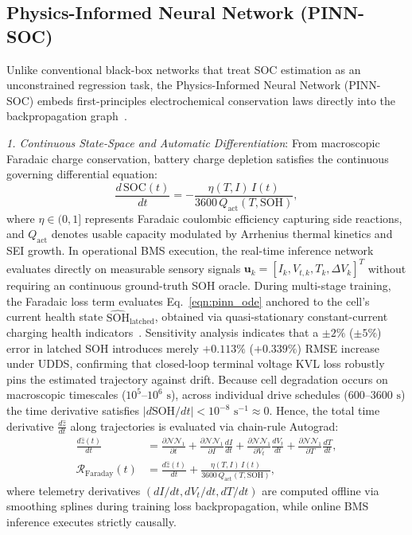 \documentclass[balance,nocopyright,upint,varvw,hyphenate,barcolor=NavyBlue,nolists]{asmejour}
\begin{document}
\subsection{Physics-Informed Neural Network (PINN-SOC)}
Unlike conventional black-box networks that treat SOC estimation as an unconstrained regression task, the Physics-Informed Neural Network (PINN-SOC) embeds first-principles electrochemical conservation laws directly into the backpropagation graph~\cite{Raissi2019pinn,Brancato2026,Li2023nature}.

\emph{1. Continuous State-Space and Automatic Differentiation}: From macroscopic Faradaic charge conservation, battery charge depletion satisfies the continuous governing differential equation:
\begin{equation}\label{eqn:pinn_ode}
\frac{d\,\text{SOC}(t)}{dt} = -\frac{\eta(T, I)\, I(t)}{3600\,Q_{\text{act}}(T, \text{SOH})},
\end{equation}
where $\eta \in (0, 1]$ represents Faradaic coulombic efficiency capturing side reactions, and $Q_{\text{act}}$ denotes usable capacity modulated by Arrhenius thermal kinetics and SEI growth. In operational BMS execution, the real-time inference network evaluates directly on measurable sensory signals $\mathbf{u}_k = [I_k, V_{t,k}, T_k, \Delta V_k]^T$ without requiring an continuous ground-truth SOH oracle. During multi-stage training, the Faradaic loss term evaluates Eq.~\eqref{eqn:pinn_ode} anchored to the cell's current health state $\hat{\text{SOH}}_{\text{latched}}$, obtained via quasi-stationary constant-current charging health indicators~\cite{Le2026charging}. Sensitivity analysis indicates that a $\pm 2\%$ ($\pm 5\%$) error in latched SOH introduces merely $+0.113\%$ ($+0.339\%$) RMSE increase under UDDS, confirming that closed-loop terminal voltage KVL loss robustly pins the estimated trajectory against drift. Because cell degradation occurs on macroscopic timescales ($10^5\text{--}10^6\text{ s}$), across individual drive schedules ($600\text{--}3600\text{ s}$) the time derivative satisfies $|d\text{SOH}/dt| < 10^{-8}\text{ s}^{-1} \approx 0$. Hence, the total time derivative $\frac{d\hat{z}}{dt}$ along trajectories is evaluated via chain-rule Autograd:
\begin{align}
\frac{d\hat{z}(t)}{dt} &= \frac{\partial \mathcal{NN}_1}{\partial t} + \frac{\partial \mathcal{NN}_1}{\partial I} \frac{dI}{dt} + \frac{\partial \mathcal{NN}_1}{\partial V_t} \frac{dV_t}{dt} + \frac{\partial \mathcal{NN}_1}{\partial T} \frac{dT}{dt}, \label{eqn:pinn_chain}\\
\mathcal{R}_{\text{Faraday}}(t) &= \frac{d\hat{z}(t)}{dt} + \frac{\eta(T, I)\, I(t)}{3600\,Q_{\text{act}}(T, \text{SOH})}, \label{eqn:res_faraday}
\end{align}
where telemetry derivatives $(dI/dt, dV_t/dt, dT/dt)$ are computed offline via smoothing splines during training loss backpropagation, while online BMS inference executes strictly causally.
\end{document}
